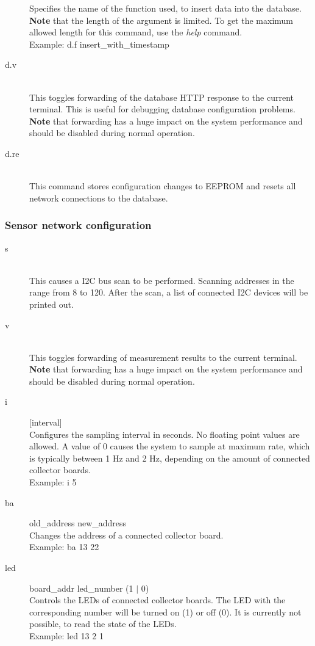 \documentclass[a4paper]{scrreprt}
\begin{document}
\begin{description}
    Specifies the name of the function used, to insert data into the database.\\
    \textbf{Note} that the length of the argument is limited. To get the maximum allowed
    length for this command, use the \emph{help} command.\\
    Example: d.f insert\_with\_timestamp
  \item[d.v]\hspace{1cm}\\
    This toggles forwarding of the database HTTP response to the current terminal.
    This is useful for debugging database configuration problems.\\
    \textbf{Note} that forwarding has a huge impact on the system performance and should be
    disabled during normal operation.
  \item[d.re]\hspace{1cm}\\
    This command stores configuration changes to EEPROM and resets all network
    connections to the database.
\end{description}
\subsubsection{Sensor network configuration}
\begin{description}
  \item[s] \hspace{1cm}\\
    This causes a I2C bus scan to be performed. Scanning addresses in the range from
    8 to 120. After the scan, a list of connected I2C devices will be printed out.
  \item[v] \hspace{1cm}\\
    This toggles forwarding of measurement results to the current terminal.\\
    \textbf{Note} that forwarding has a huge impact on the system performance and should be
    disabled during normal operation.
  \item[i] [interval]\\
    Configures the sampling interval in seconds. No floating point values are allowed.
    A value of 0 causes the system to sample at maximum rate, which is typically
    between 1 Hz and 2 Hz, depending on the amount of connected collector boards.\\
    Example: i 5
  \item[ba] old\_address new\_address\\
    Changes the address of a connected collector board.\\
    Example: ba 13 22
  \item[led] board\_addr led\_number (1 $|$ 0)\\
    Controls the LEDs of connected collector boards. The LED with the corresponding number
    will be turned on (1) or off (0). It is currently not possible, to read the state of the LEDs.\\
    Example: led 13 2 1
\end{description}
\end{document}
